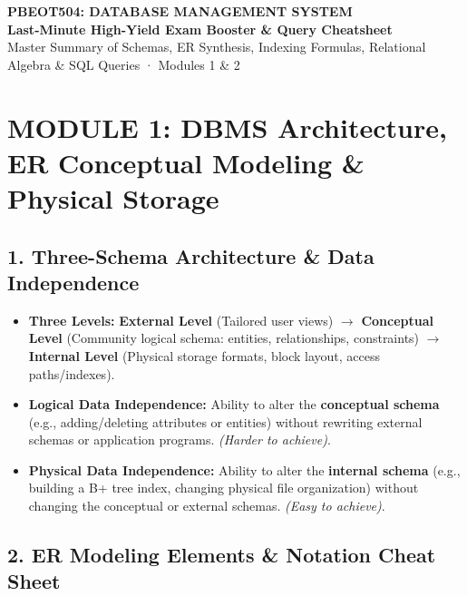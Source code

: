 \documentclass[10pt,a4paper]{article}
\begin{document}
\begin{center}
  {\LARGE\bfseries\sffamily\color{AnthDark} PBEOT504: DATABASE MANAGEMENT SYSTEM}\\[0.2em]
  {\large\sffamily\color{AnthOrange}\textbf{Last-Minute High-Yield Exam Booster \& Query Cheatsheet}}\\[0.2em]
  {\footnotesize\sffamily\color{AnthMidGray} Master Summary of Schemas, ER Synthesis, Indexing Formulas, Relational Algebra \& SQL Queries · Modules 1 \& 2}
\end{center}
\vspace{-0.5em}

\section{MODULE 1: DBMS Architecture, ER Conceptual Modeling \& Physical Storage}

\subsection{1. Three-Schema Architecture \& Data Independence}
\begin{itemize}
  \item \textbf{Three Levels:} \textbf{External Level} (Tailored user views) $\to$ \textbf{Conceptual Level} (Community logical schema: entities, relationships, constraints) $\to$ \textbf{Internal Level} (Physical storage formats, block layout, access paths/indexes).
  \item \textbf{Logical Data Independence:} Ability to alter the \textbf{conceptual schema} (e.g., adding/deleting attributes or entities) without rewriting external schemas or application programs. \emph{(Harder to achieve)}.
  \item \textbf{Physical Data Independence:} Ability to alter the \textbf{internal schema} (e.g., building a B+ tree index, changing physical file organization) without changing the conceptual or external schemas. \emph{(Easy to achieve)}.
\end{itemize}

\subsection{2. ER Modeling Elements \& Notation Cheat Sheet}
\end{document}
